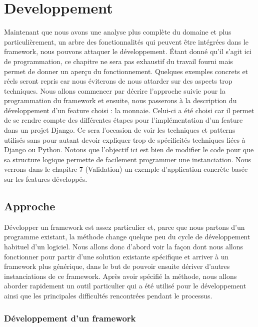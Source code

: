 \section{Developpement}

Maintenant que nous avons une analyse plus complète du domaine et plus particulièrement,  un arbre des fonctionnalités qui peuvent être intégrées dans le framework,  nous pouvons attaquer le développement.  Étant donné qu'il s'agit ici de programmation,  ce chapitre ne sera pas exhaustif du travail fourni mais permet de donner un aperçu du fonctionnement.  Quelques exemples concrets et réels seront repris car nous éviterons de nous attarder sur des aspects trop techniques.  Nous allons commencer par décrire l'approche suivie pour la programmation du framework et ensuite,   nous passerons à la description du développement d'un feature choisi : la monnaie.  Celui-ci a été choisi car il permet de se rendre compte des différentes étapes pour l'implémentation d'un feature dans un projet Django.  Ce sera l'occasion de voir les techniques et patterns utilisés sans pour autant devoir expliquer trop de spécificités techniques liées à Django ou Python.  Notons que l'objectif ici est bien de modifier le code pour que sa structure logique permette de facilement programmer une instanciation.  Nous verrons dans le chapitre 7 (Validation) un exemple d'application concrète basée sur les features développés.   

\subsection{Approche}
Développer un framework est assez particulier et,  parce que nous partons d'un programme existant,  la méthode change quelque peu du cycle de développement habituel d'un logiciel.  Nous allons donc d'abord voir la façon dont nous allons fonctionner pour partir d'une solution existante spécifique et arriver à un framework plus générique,  dans le but de pouvoir ensuite dériver d'autres instanciations de ce framework.  Après avoir spécifié la méthode,  nous allons aborder rapidement un outil particulier qui a été utilisé pour le développement ainsi que les principales difficultés rencontrées pendant le processus.

\subsubsection{Développement d'un framework}

